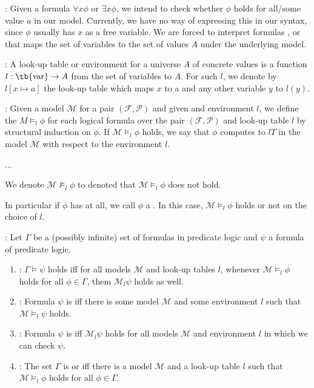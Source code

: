     \par {}: Given a formula $\forall x \phi$ or $\exists x \phi$, we intend to check whether $\phi$ holds for all/some value $a$ in our model. Currently, we have no way of expressing this in our syntax, since $\phi$ usually has $x$ as a free variable. We are forced to interpret formulas , or  that maps the set of variables to the set of values $A$ under the underlying model.

    : A look-up table or environment for a universe $A$ of concrete values is a function $l: \text{\tb{var}} \to A$ from the set of variables  to $A$. For such $l$, we denote by $l[x \mapsto a]$ the look-up table which maps $x$ to a and any other variable $y$ to $l(y)$.

    : Given a model $\mathcal{M}$ for a pair $(\mathcal{F}, \mathcal{P})$ and given and environment $l$, we define the  $M \models_{l} \phi$ for each logical formula over the pair $(\mathcal{F}, \mathcal{P})$ and look-up table $l$ by structural induction on $\phi$. If $\mathcal{M} \models_{l} \phi$ holds, we say that $\phi$ computes to $lT$ in the model $\mathcal{M}$ with respect to the environment $l$.
    \par ...
    \par We denote $\mathcal{M} \not \models_{l} \phi$ to denoted that $\mathcal{M} \models_{l} \phi$ does not hold.

    \par In particular if $\phi$ has  at all, we call $\phi$ a . In this case, $\mathcal{M} \models_{l} \phi$ holds or not  on the choice of $l$.

    : Let $\Gamma$ be a (possibly infinite) set of formulas in predicate logic and $\psi$ a formula of predicate logic.
    \begin{enumerate}[1.]
      \item {}: $\Gamma \models \psi$ holds iff for all models $\mathcal{M}$ and look-up tables $l$, whenever $\mathcal{M} \models_l \phi$ holds for all $\phi \in \Gamma$, them $\mathcal{M}_l \psi$ holds as well.
      \item {}: Formula $\psi$ is  iff there is some model $\mathcal{M}$ and some environment $l$ such that $\mathcal{M} \models_l \psi$ holds.
      \item {}: Formula $\psi$ is  iff $\mathcal{M}_l \psi$ holds for all models $\mathcal{M}$ and environment $l$ in which we can check $\psi$.
      \item {}: The set $\Gamma$ is  or  iff there is a model $\mathcal{M}$ and a look-up table $l$ such that $\mathcal{M} \models_l \phi$ holds for all $\phi \in \Gamma$.
    \end{enumerate}

